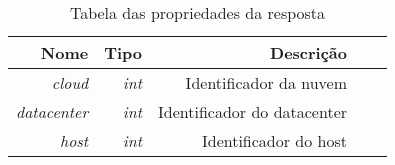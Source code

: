 \begin{table}[!htb]
    \centering
    \caption[Representação do Host de Resposta]{Tabela das propriedades da resposta
    \label{tab:response-host}}
    \begin{tabular}{rrrrr}
        \toprule
            Nome & Tipo & Descrição \\ 
        \midrule
            \textit{cloud} & \textit{int} & Identificador da nuvem \\
            \textit{datacenter} & \textit{int} & Identificador do datacenter \\
            \textit{host} & \textit{int} & Identificador do host \\
        \bottomrule
    \end{tabular}
\end{table}
